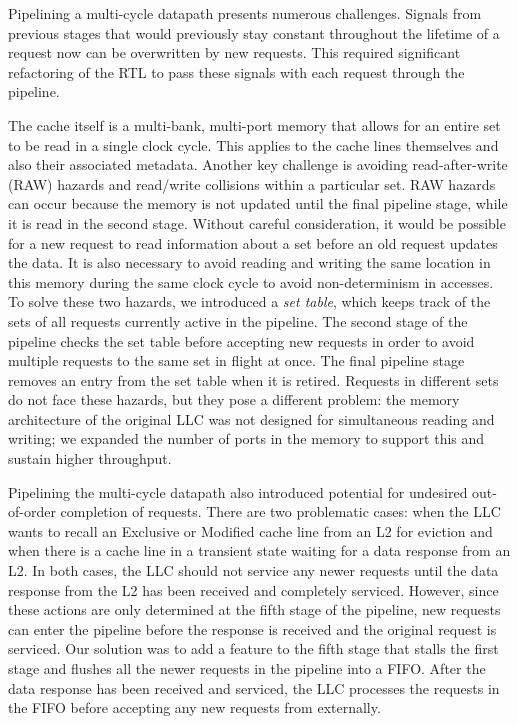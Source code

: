 \par Pipelining a multi-cycle datapath presents numerous challenges. Signals
from previous stages that would previously stay constant throughout the
lifetime of a request now can be overwritten by new requests. This required
significant refactoring of the RTL to pass these signals with each request
through the pipeline.

\par The cache itself is a multi-bank, multi-port memory that allows for an
entire set to be read in a single clock cycle. This applies to the cache lines
themselves and also their associated metadata. Another key challenge is
avoiding read-after-write (RAW) hazards and read/write collisions within a
particular set.  RAW hazards can occur because the memory is not updated until
the final pipeline stage, while it is read in the second stage. Without careful
consideration, it would be possible for a new request to read information about
a set before an old request updates the data. It is also necessary to avoid
reading and writing the same location in this memory during the same clock
cycle to avoid non-determinism in accesses. To solve these two hazards, we
introduced a \emph{set table}, which keeps track of the sets of all requests
currently active in the pipeline. The second stage of the pipeline checks the
set table before accepting new requests in order to avoid multiple requests to
the same set in flight at once. The final pipeline stage removes an entry from
the set table when it is retired. Requests in different sets do not face these
hazards, but they pose a different problem: the memory architecture of the
original LLC was not designed for simultaneous reading and writing; we expanded
the number of ports in the memory to support this and sustain higher
throughput.

\par Pipelining the multi-cycle datapath also introduced potential for
undesired out-of-order completion of requests. There are two problematic cases:
when the LLC wants to recall an Exclusive or Modified cache line from an L2 for
eviction and when there is a cache line in a transient state waiting for a data
response from an L2. In both cases, the LLC should not service any newer
requests until the data response from the L2 has been received and completely
serviced. However, since these actions are only determined at the fifth stage
of the pipeline, new requests can enter the pipeline before the response is
received and the original request is serviced. Our solution was to add a
feature to the fifth stage that stalls the first stage and flushes all the
newer requests in the pipeline into a FIFO. After the data response has been
received and serviced, the LLC processes the requests in the FIFO before
accepting any new requests from externally.

